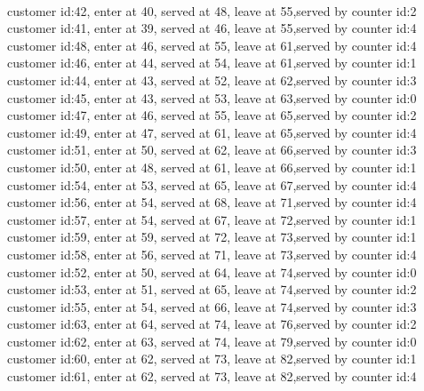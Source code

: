 \documentclass[UTF8]{ctexart}
\begin{document}
\\
customer id:42, enter at 40, served at 48, leave at 55,served by counter id:2
\\
customer id:41, enter at 39, served at 46, leave at 55,served by counter id:4
\\
customer id:48, enter at 46, served at 55, leave at 61,served by counter id:4
\\
customer id:46, enter at 44, served at 54, leave at 61,served by counter id:1
\\
customer id:44, enter at 43, served at 52, leave at 62,served by counter id:3
\\
customer id:45, enter at 43, served at 53, leave at 63,served by counter id:0
\\
customer id:47, enter at 46, served at 55, leave at 65,served by counter id:2
\\
customer id:49, enter at 47, served at 61, leave at 65,served by counter id:4
\\
customer id:51, enter at 50, served at 62, leave at 66,served by counter id:3
\\
customer id:50, enter at 48, served at 61, leave at 66,served by counter id:1
\\
customer id:54, enter at 53, served at 65, leave at 67,served by counter id:4
\\
customer id:56, enter at 54, served at 68, leave at 71,served by counter id:4
\\
customer id:57, enter at 54, served at 67, leave at 72,served by counter id:1
\\
customer id:59, enter at 59, served at 72, leave at 73,served by counter id:1
\\
customer id:58, enter at 56, served at 71, leave at 73,served by counter id:4
\\
customer id:52, enter at 50, served at 64, leave at 74,served by counter id:0
\\
customer id:53, enter at 51, served at 65, leave at 74,served by counter id:2
\\
customer id:55, enter at 54, served at 66, leave at 74,served by counter id:3
\\
customer id:63, enter at 64, served at 74, leave at 76,served by counter id:2
\\
customer id:62, enter at 63, served at 74, leave at 79,served by counter id:0
\\
customer id:60, enter at 62, served at 73, leave at 82,served by counter id:1
\\
customer id:61, enter at 62, served at 73, leave at 82,served by counter id:4
\end{document}
